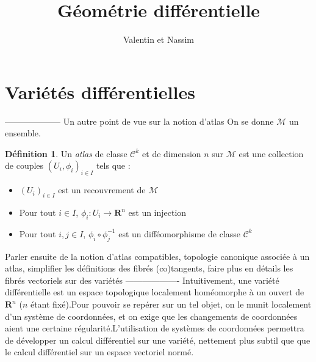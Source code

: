 \documentclass[12pt,a4paper]{article}
\author{Valentin \bsc{Clarisse} et Nassim \bsc{Arifette}}
\title{Géométrie différentielle}
\theoremstyle{definition}
\newtheorem{defn}[thm]{Définition}
\begin{document}
\maketitle
\newpage
\tableofcontents
\newpage
\section{Variétés différentielles}
--------------------
Un autre point de vue sur la notion d'atlas
On se donne $\mathcal{M}$ un ensemble.
\begin{defn}
Un \emph{atlas} de classe $\mathcal{C}^k$ et de dimension $n$ sur $\mathcal{M}$ est une collection de couples $(U_i,\phi_i)_{i\in I}$ tels que :
\begin{itemize}
\item $(U_i)_{i\in I}$ est un recouvrement de $\mathcal{M}$
\item Pour tout $i\in I$, $\phi_i:U_i\to \mathbf{R}^n$ est un injection
\item Pour tout $i,j\in I$, $\phi_i\circ\phi_j^{-1}$ est un difféomorphisme de classe $\mathcal{C}^k$
\end{itemize}
\end{defn}
Parler ensuite de la notion d'atlas compatibles, topologie canonique associée à un atlas, simplifier les définitions des fibrés (co)tangents, faire plus en détails les fibrés vectoriels sur des variétés
-------------------
Intuitivement, une variété différentielle est un espace topologique localement homéomorphe à un ouvert de $\mathbf{R}^n$ ($n$ étant fixé).\newline Pour pouvoir se repérer sur un tel objet, on le munit localement d'un système de coordonnées, et on exige que les changements de coordonnées aient une certaine régularité.\newline L'utilisation de systèmes de coordonnées permettra de développer un calcul différentiel sur une variété, nettement plus subtil que que le calcul différentiel sur un espace vectoriel normé.

\medskip
\end{document}

